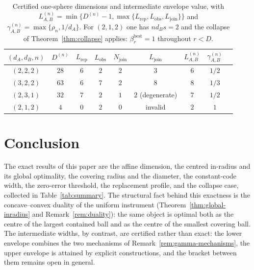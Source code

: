 \documentclass[11pt,a4paper]{article}
\begin{document}
\begin{table}[t]
\centering
\small
\setlength{\tabcolsep}{4pt}
\begin{tabular}{ccccccccc}
\toprule
$(d_A,d_B,n)$ & $D^{(n)}$ & $L_{\mathrm{rep}}$ & $L_{\mathrm{obs}}$ & $N_{\mathrm{join}}$ & $L_{\mathrm{join}}$ & $L_{A,B}^{(n)}$ & $\gamma_{A,B}^{(n)}$\\
\midrule
$(2,2,2)$ & $28$ & $6$ & $2$ & $2$ & $3$ & $6$ & $1/2$\\
$(3,2,2)$ & $63$ & $6$ & $7$ & $2$ & $8$ & $8$ & $1/3$\\
$(2,3,1)$ & $32$ & $7$ & $2$ & $1$ & $2$ (degenerate) & $7$ & $1/2$\\
$(2,1,2)$ & $4$  & $0$ & $2$ & $0$ & invalid & $2$ & $1$\\
\bottomrule
\end{tabular}
\caption{Certified one-sphere dimensions and intermediate envelope value, with $L_{A,B}^{(n)}=\min\{D^{(n)}-1,\max\{L_{\mathrm{rep}},L_{\mathrm{obs}},L_{\mathrm{join}}\}\}$ and $\gamma_{A,B}^{(n)}=\max\{\rho_n,1/d_A\}$. For $(2,1,2)$ one has $nd_Bs=2$ and the collapse of Theorem~\ref{thm:collapse} applies: $\beta_r^{\mathrm{best}}=1$ throughout $r<D$.}
\label{tab:thresholds}
\end{table}

\section{Conclusion}
\label{sec:conclusion}

The exact results of this paper are the affine dimension, the centred in-radius and its global optimality, the covering radius and the diameter, the constant-code width, the zero-error threshold, the replacement profile, and the collapse case, collected in Table~\ref{tab:summary}. The structural fact behind this exactness is the concave--convex duality of the uniform instrument (Theorem~\ref{thm:global-inradius} and Remark~\ref{rem:duality}): the same object is optimal both as the centre of the largest contained ball and as the centre of the smallest covering ball. The intermediate widths, by contrast, are certified rather than exact: the lower envelope combines the two mechanisms of Remark~\ref{rem:gamma-mechanisms}, the upper envelope is attained by explicit constructions, and the bracket between them remains open in general.
\end{document}
